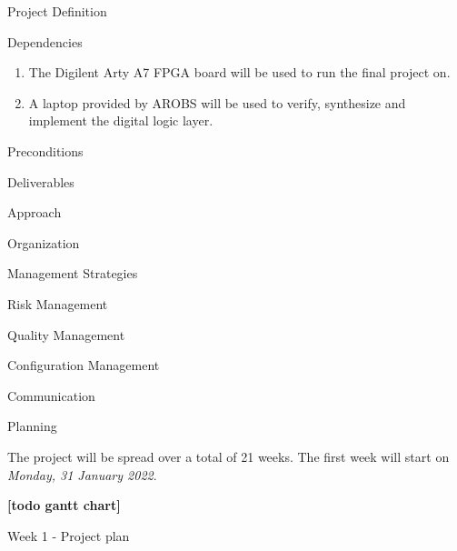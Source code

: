 \documentclass{matthijs}
\begin{document}
\begin{hoofdstuk}{Project Definition}
\begin{paragraaf}{Dependencies}
			\begin{enumerate}

				\item The Digilent Arty A7 FPGA board will be used to run the final project on.
				\item A laptop provided by AROBS will be used to verify, synthesize and implement the digital logic layer.
		
			\end{enumerate}

		\end{paragraaf}

		\begin{paragraaf}{Preconditions}

		\end{paragraaf}

	\end{hoofdstuk}

	\begin{hoofdstuk}{Deliverables}

	\end{hoofdstuk}

	\begin{hoofdstuk}{Approach}

	\end{hoofdstuk}

	\begin{hoofdstuk}{Organization}

	\end{hoofdstuk}

	\begin{hoofdstuk}{Management Strategies}

		\begin{paragraaf}{Risk Management}

		\end{paragraaf}
		
		\begin{paragraaf}{Quality Management}

		\end{paragraaf}

		\begin{paragraaf}{Configuration Management}

		\end{paragraaf}

		\begin{paragraaf}{Communication}

		\end{paragraaf}

	\end{hoofdstuk}

	\begin{hoofdstuk}{Planning}

		The project will be spread over a total of 21 weeks.
		The first week will start on \textit{Monday, 31 January 2022}.

		\textbf{[todo gantt chart]}

		Week 1 - Project plan

		
	\end{hoofdstuk}
\end{document}

